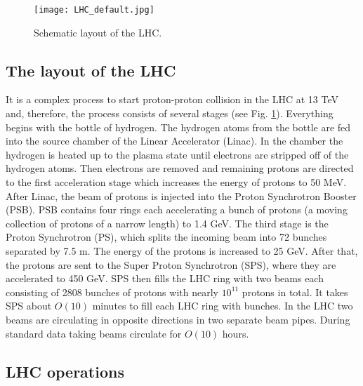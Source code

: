 \begin{normalsize}
\begin{figure}[H]
  \centering
  \texttt{[image: LHC\_default.jpg]}
  \caption {Schematic layout of the LHC.}
  \label{lhcmap}
\end{figure}



\subsection{The layout of the LHC}

It is a complex process to start proton-proton collision in the LHC at 13 TeV and, therefore, the process consists of several stages (see Fig. \ref{lhcmap}). Everything begins with the bottle of hydrogen. The hydrogen atoms from the bottle are fed into the source chamber of the Linear Accelerator (Linac). In the chamber the hydrogen is heated up to the plasma state until electrons are stripped off of the hydrogen atoms. Then electrons are removed and remaining protons are directed to the first acceleration stage which increases the energy of protons to 50 MeV. After Linac, the beam of protons is injected into the Proton Synchrotron Booster (PSB). PSB contains four rings each accelerating a bunch of protons (a moving collection of protons of a narrow length) to 1.4 GeV. The third stage is the Proton Synchrotron (PS), which splits the incoming beam into 72 bunches separated by 7.5 m. The energy of the protons is increased to 25 GeV. After that, the protons are sent to the Super Proton Synchrotron (SPS), where they are accelerated to 450 GeV. SPS then fills the LHC ring with two beams each consisting of 2808 bunches of protons with nearly $10^{11}$ protons in total. It takes SPS about $O(10)$ minutes to fill each LHC ring with bunches. In the LHC two beams are circulating in opposite directions in two separate beam pipes. During standard data taking beams circulate for $O(10)$ hours.  


\subsection{LHC operations}


\end{normalsize}
